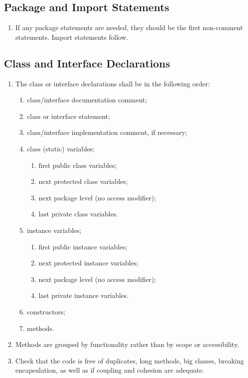 \documentclass{article}
\begin{document}
\subsection*{Package and Import Statements}\begin{enumerate}[resume]
\item If any package statements are needed, they should be the first non-comment statements. Import statements follow.
\end{enumerate}

\subsection*{Class and Interface Declarations}\begin{enumerate}[resume]
\item The class or interface declarations shall be in the following order:
	\begin{enumerate}
		\item class/interface documentation comment;
		\item class or interface statement;
		\item class/interface implementation comment, if necessary;
		\item class (static) variables;
		\begin{enumerate}
			\item first public class variables;
			\item next protected class variables;
			\item next package level (no access modifier);
			\item last private class variables.
		\end{enumerate}
		\item instance variables;
		\begin{enumerate}
			\item first public instance variables;
			\item next protected instance variables;
			\item next package level (no access modifier);
			\item last private instance variables.
		\end{enumerate}
		\item constructors;
		\item methods.
	\end{enumerate}
	\item Methods are grouped by functionality rather than by scope or accessibility.
	\item Check that the code is free of duplicates, long methods, big classes, breaking encapsulation, as well as if coupling and cohesion are adequate.
\end{enumerate}
\end{document}
